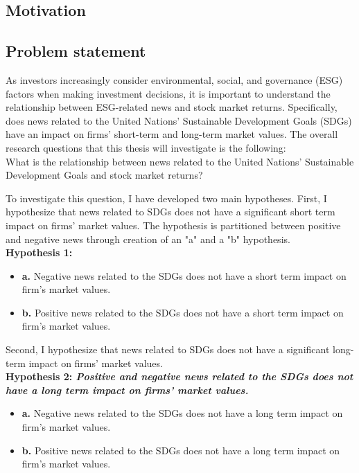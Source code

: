 \subsection{Motivation}


\subsection{Problem statement}

As investors increasingly consider environmental, social, and governance (ESG) factors when making investment decisions, it is important to understand the relationship between ESG-related news and stock market returns.  Specifically, does news related to the United Nations' Sustainable Development Goals (SDGs) have an impact on firms' short-term and long-term market values. The overall research questions that this thesis will investigate is the following: \\

What is the relationship between news related to the United Nations' Sustainable Development Goals and stock market returns?

To investigate this question, I have developed two main hypotheses. First, I hypothesize that news related to SDGs does not have a significant short term impact on firms' market values. The hypothesis is partitioned between positive and negative news through creation of an "a" and a "b" hypothesis.  \\

\textbf{Hypothesis 1:} 

\begin{itemize}
  \item \textbf{a.}  Negative news related to the SDGs does not have a short term impact on firm's market values.
  \item \textbf{b.}  Positive news related to the SDGs does not have a short term impact on firm's market values.
\end{itemize}

Second, I hypothesize that news related to SDGs does not have a significant long-term impact on firms' market values. \\

\textbf{
Hypothesis 2: \textit{Positive and negative news related to the SDGs does not have a long term impact on firms' market values.}}

\begin{itemize}
  \item \textbf{a.}  Negative news related to the SDGs does not have a long term impact on firm's market values.
  \item \textbf{b.}  Positive news related to the SDGs does not have a long term impact on firm's market values.
\end{itemize}


